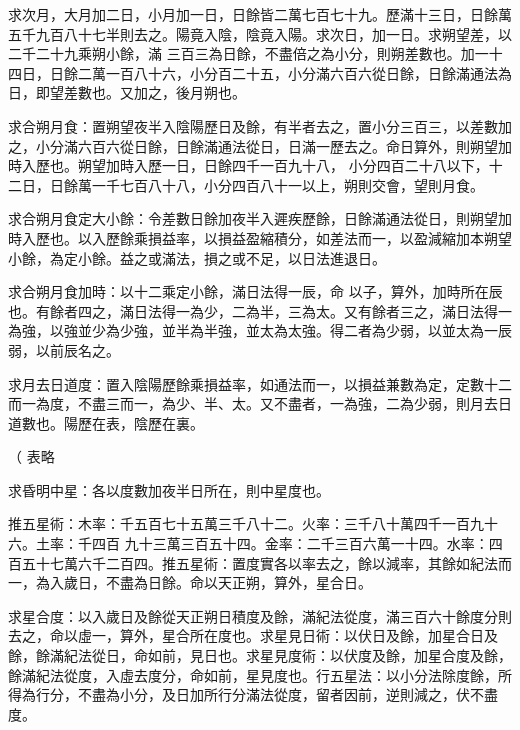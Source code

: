 \begin{pinyinscope}
 求次月，大月加二日，小月加一日，日餘皆二萬七百七十九。歷滿十三日，日餘萬五千九百八十七半則去之。陽竟入陰，陰竟入陽。求次日，加一日。求朔望差，以二千二十九乘朔小餘，滿
 三百三為日餘，不盡倍之為小分，則朔差數也。加一十四日，日餘二萬一百八十六，小分百二十五，小分滿六百六從日餘，日餘滿通法為日，即望差數也。又加之，後月朔也。



 求合朔月食：置朔望夜半入陰陽歷日及餘，有半者去之，置小分三百三，以差數加之，小分滿六百六從日餘，日餘滿通法從日，日滿一歷去之。命日算外，則朔望加時入歷也。朔望加時入歷一日，日餘四千一百九十八，
 小分四百二十八以下，十二日，日餘萬一千七百八十八，小分四百八十一以上，朔則交會，望則月食。



 求合朔月食定大小餘：令差數日餘加夜半入遲疾歷餘，日餘滿通法從日，則朔望加時入歷也。以入歷餘乘損益率，以損益盈縮積分，如差法而一，以盈減縮加本朔望小餘，為定小餘。益之或滿法，損之或不足，以日法進退日。



 求合朔月食加時：以十二乘定小餘，滿日法得一辰，命
 以子，算外，加時所在辰也。有餘者四之，滿日法得一為少，二為半，三為太。又有餘者三之，滿日法得一為強，以強並少為少強，並半為半強，並太為太強。得二者為少弱，以並太為一辰弱，以前辰名之。



 求月去日道度：置入陰陽歷餘乘損益率，如通法而一，以損益兼數為定，定數十二而一為度，不盡三而一，為少、半、太。又不盡者，一為強，二為少弱，則月去日道數也。陽歷在表，陰歷在裏。



 （
 表略



 求昏明中星：各以度數加夜半日所在，則中星度也。



 推五星術：木率：千五百七十五萬三千八十二。火率：三千八十萬四千一百九十六。土率：千四百
 九十三萬三百五十四。金率：二千三百六萬一十四。水率：四
 百五十七萬六千二百四。推五星術：置度實各以率去之，餘以減率，其餘如紀法而一，為入歲日，不盡為日餘。命以天正朔，算外，星合日。



 求星合度：以入歲日及餘從天正朔日積度及餘，滿紀法從度，滿三百六十餘度分則去之，命以虛一，算外，星合所在度也。求星見日術：以伏日及餘，加星合日及餘，餘滿紀法從日，命如前，見日也。求星見度術：以伏度及餘，加星合度及餘，餘滿紀法從度，入虛去度分，命如前，星見度也。行五星法：以小分法除度餘，所得為行分，不盡為小分，及日加所行分滿法從度，留者因前，逆則減之，伏不盡度。




\end{pinyinscope}

